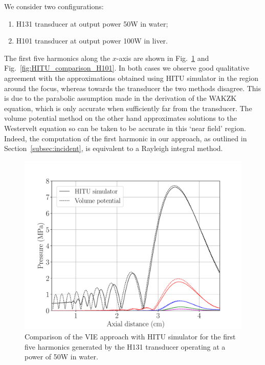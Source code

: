 \documentclass[preprint]{JASA}
\begin{document}
We consider two configurations: 
\begin{enumerate}
    \item H131 transducer at output power 50W in water;
    \item H101 transducer at output power 100W in liver.
\end{enumerate}
The first five harmonics along the $x$-axis are shown in 
Fig.~\ref{fig:HITU_comparison_H131} and Fig.~\ref{fig:HITU_comparison_H101}.
In both cases we observe good qualitative agreement with the approximations 
obtained using HITU simulator in the region around the focus, whereas towards the transducer 
the two methods disagree. This is due to the parabolic assumption 
made in the derivation of the WAKZK equation, which is only accurate when 
sufficiently far from the transducer. The volume potential method on the other hand 
approximates solutions to the Westervelt equation so can be taken to be accurate 
in this `near field' region. Indeed, the computation of the first harmonic in 
our approach, as outlined in Section~\ref{subsec:incident}, is equivalent to a Rayleigh 
integral method.
\begin{figure}[h!]
    \centering
    \includegraphics[width=\linewidth]{figures/H131_HITU_comparison_water_test_power50.pdf}
    \caption{Comparison of the VIE approach with HITU simulator for the first 
    five harmonics generated by the H131 transducer operating at a power of 50W in water.}
    \label{fig:HITU_comparison_H131}
\end{figure}
\end{document}
